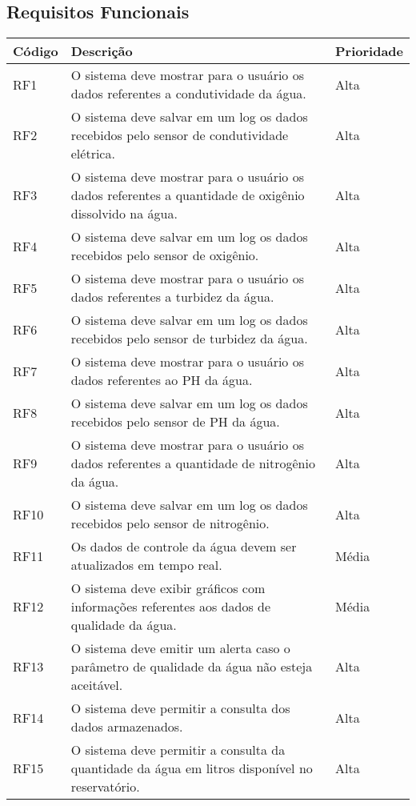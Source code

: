 \documentclass[12pt,openright,oneside,a4paper,brazil]{abntex2}
\begin{document}
\subsection*{Requisitos Funcionais}
\begin{longtable}{|p{4cm}|p{9cm}|p{2cm}|}\hline	
\textbf{Código}	& \textbf{Descrição} & \textbf{Prioridade}\\ \hline	
RF1	& O sistema deve mostrar para o usuário os dados referentes a condutividade da água.	& Alta\\ \hline
RF2	& O sistema deve salvar em um log os dados recebidos pelo sensor de condutividade elétrica.	& Alta\\ \hline
RF3	& O sistema deve mostrar para o usuário os dados referentes a quantidade de oxigênio dissolvido na água.	& Alta\\ \hline
RF4	& O sistema deve salvar em um log os dados recebidos pelo sensor de oxigênio.	& Alta\\ \hline
RF5	& O sistema deve mostrar para o usuário os dados referentes a turbidez da água.	& Alta\\ \hline
RF6	& O sistema deve salvar em um log os dados recebidos pelo sensor de turbidez da água.	& Alta\\ \hline
RF7	& O sistema deve mostrar para o usuário os dados referentes ao PH da água.	& Alta\\ \hline
RF8	& O sistema deve salvar em um log os dados recebidos pelo sensor de PH da água.& 	Alta\\ \hline
RF9	& O sistema deve mostrar para o usuário os dados referentes a quantidade de nitrogênio  da água.	& Alta\\ \hline
RF10 & 	O sistema deve salvar em um log os dados recebidos pelo sensor de nitrogênio.& 	Alta\\ \hline
RF11	& Os dados de controle da água devem ser atualizados em tempo real.			& Média\\ \hline
RF12	& O sistema deve exibir gráficos com informações referentes aos dados de qualidade da água.		& Média\\ \hline
RF13& 	O sistema deve emitir um alerta caso o parâmetro de qualidade da água não esteja aceitável.& 	Alta\\ \hline
RF14	& O sistema deve permitir a consulta dos dados armazenados.			& Alta\\ \hline
RF15& 	O sistema deve permitir a consulta da quantidade da água em litros disponível no reservatório.	& Alta\\ \hline

\end{longtable}
\end{document}
